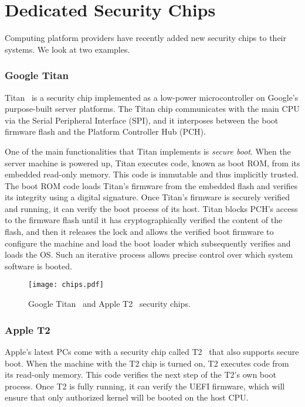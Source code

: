 \section*{Dedicated Security Chips}

Computing platform providers have recently added new security chips to their systems. We look at two examples.

\subsubsection*{Google Titan}

Titan~\cite{titan} is a security chip implemented as a low-power microcontroller on Google's purpose-built server platforms. The Titan chip communicates with the main CPU via the Serial Peripheral Interface (SPI), and it interposes between the boot firmware flash and the Platform Controller Hub (PCH).

 One of the main functionalities that Titan implements is \emph{secure boot}. When the server machine is powered up, Titan executes code, known as boot ROM, from its embedded read-only memory. This code is immutable and thus implicitly trusted. The boot ROM code loads Titan's firmware from the embedded flash and verifies its integrity using a digital signature. Once Titan's firmware is securely verified and running, it can verify the boot process of its host. Titan blocks PCH's access to the firmware flash until it has cryptographically verified the content of the flash, and then it releases the lock and allows the verified boot firmware to configure the machine and load the boot loader which subsequently verifies and loads the OS. Such an iterative process allows precise control over which system software is booted. 

\begin{figure}[t]
    \centering
    \texttt{[image: chips.pdf]}
    \caption{Google Titan~\cite{titan} and Apple T2~\cite{t2} security chips.}
\label{fig:prototype}   
\end{figure}

 
\subsubsection*{Apple T2}
 
Apple's latest PCs come with a security chip called T2~\cite{t2} that also supports secure boot. When the machine with the T2 chip is turned on, T2 executes code from its read-only memory. This code verifies the next step of the T2's own boot process. Once T2 is fully running, it can verify the UEFI firmware, which will ensure that only authorized kernel will be booted on the host CPU.

